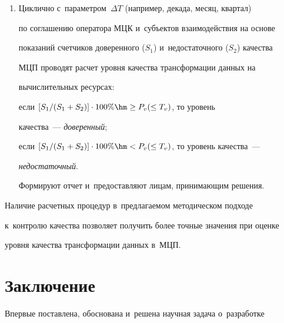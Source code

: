 \begin{enumerate}[1.]
групповом вы\-чис\-ли\-тель\-ном ресурсе~$v$ и~до\-бав\-ля\-ют~1 (единицу) 

в~счетчик доверенного качества МЦП.



Если $P_N^k(j) < P_v(\leq T_v)$, то классифицируют значение~$L_v$ как 

\textit{недостаточное} значение качества трансформации данных на 

групповом вы\-чис\-ли\-тель\-ном ресурсе~$v$ до\-бав\-ля\-ют~1 (единицу) 

в~счетчик недостаточного качества МЦП.

\item Циклично с~параметром~$\Delta T$ (например, декада, месяц, квартал) 

по соглашению оператора МЦК и~субъектов взаимодействия на основе 

показаний счетчиков доверенного ($S_1$) и~недостаточного ($S_2$) качества 

МЦП проводят расчет уров\-ня качества трансформации данных на 

вы\-чис\-ли\-тель\-ных ре\-сур\-сах:



если $[S_1/(S_1+S_2)] \cdot 100\% \hm\geq P_v(\leq T_v)$, то уровень  

качества~--- \textit{доверенный};



если $[S_1/(S_1+S_2)] \cdot 100\% \hm< P_v(\leq T_v)$, то уровень качества~--- 

\textit{недостаточный}.



Формируют отчет и~предоставляют лицам, при\-ни\-ма\-ющим решения.

\end{enumerate}

  

  Наличие расчетных процедур в~предлагаемом методическом подходе 

к~контролю качества поз\-во\-ля\-ет получить более точ\-ные значения при оценке 

уровня качества трансформации данных в~МЦП.



\section{Заключение }

  

  Впервые поставлена, обосно\-ва\-на и~решена научная задача о~разработке 

